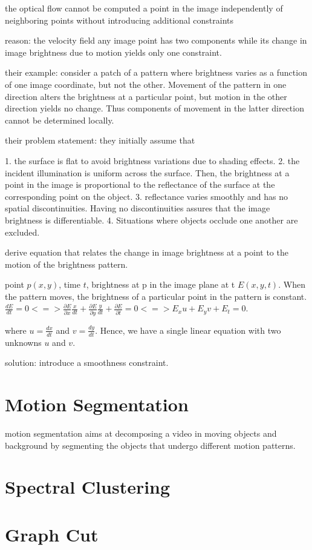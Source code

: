 the optical flow cannot be computed a point in the image independently of neighboring points without introducing additional constraints

reason: the velocity field any image point has two components while its change in image brightness due to motion yields only one constraint.

their example: consider a patch of a pattern where brightness varies as a function of one image coordinate, but not the other. Movement of the pattern in one direction alters the brightness at a particular point, but motion in the other direction yields no change. Thus components of movement in the latter direction cannot be determined locally.

their problem statement:
they initially assume that 

1. the surface is flat to avoid brightness variations due to shading effects.
2. the incident illumination is uniform across the surface. Then, the brightness at a point in the image is proportional to the reflectance of the surface at the corresponding point on the object.
3. reflectance varies smoothly and has no spatial discontinuities. Having no discontinuities assures that the image brightness is differentiable.
4. Situations where objects occlude one another are excluded.

derive equation that relates the change in image brightness at a point to the motion of the brightness pattern.

point $p(x,y)$, time $t$, brightness at p in the image plane at t $E(x,y,t)$.
When the pattern moves, the brightness of a particular point in the pattern is constant. 
$\frac{d E}{dt} = 0 <=> \frac{\partial E}{\partial x} \frac{x}{dt} + \frac{\partial E}{\partial y} \frac{y}{dt} + \frac{\partial E}{\partial t} = 0 <=> E_{x} u + E_{y} v + E_{t} = 0$.

where $u = \frac{dx}{dt}$ and $v = \frac{dy}{dt}$. Hence, we have a single linear equation with two unknowns $u$ and $v$.

solution: introduce a smoothness constraint.


\section{Motion Segmentation}
motion segmentation aims at decomposing a video in moving objects and background by segmenting the objects that undergo different motion patterns.
\section{Spectral Clustering}
\section{Graph Cut}

